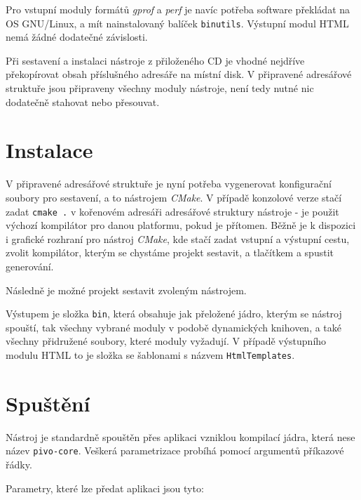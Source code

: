 \documentclass[czech,BP]{thesiskiv}
\begin{document}
Pro vstupní moduly formátů \emph{gprof} a \emph{perf} je navíc potřeba software překládat na OS GNU/Linux, a mít nainstalovaný balíček \texttt{binutils}. Výstupní modul HTML nemá žádné dodatečné závislosti.

Při sestavení a instalaci nástroje z přiloženého CD je vhodné nejdříve překopírovat obsah příslušného adresáře na místní disk. V připravené adresářové struktuře jsou připraveny všechny moduly nástroje, není tedy nutné nic dodatečně stahovat nebo přesouvat.

\section{Instalace}

V připravené adresářové struktuře je nyní potřeba vygenerovat konfigurační soubory pro sestavení, a to nástrojem \emph{CMake}. V případě konzolové verze stačí zadat \texttt{cmake .} v kořenovém adresáři adresářové struktury nástroje - je použit výchozí kompilátor pro danou platformu, pokud je přítomen. Běžně je k dispozici i grafické rozhraní pro nástroj \emph{CMake}, kde stačí zadat vstupní a výstupní cestu, zvolit kompilátor, kterým se chystáme projekt sestavit, a tlačítkem  a  spustit generování.

Následně je možné projekt sestavit zvoleným nástrojem.

Výstupem je složka \texttt{bin}, která obsahuje jak přeložené jádro, kterým se nástroj spouští, tak všechny vybrané moduly v podobě dynamických knihoven, a také všechny přidružené soubory, které moduly vyžadují. V případě výstupního modulu HTML to je složka se šablonami s názvem \texttt{HtmlTemplates}.



\section{Spuštění}

Nástroj je standardně spouštěn přes aplikaci vzniklou kompilací jádra, která nese název \texttt{pivo-core}. Veškerá parametrizace probíhá pomocí argumentů příkazové řádky.

Parametry, které lze předat aplikaci jsou tyto:
\end{document}
